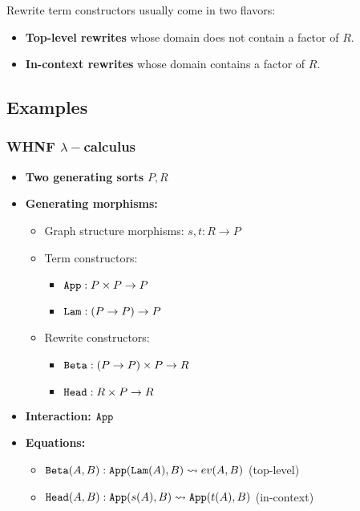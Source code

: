 \documentclass{article}
\begin{document}
Rewrite term constructors usually come in two flavors:

\begin{itemize}
    \item \textbf{Top-level rewrites} whose domain does not contain a factor of $R$.
    \item \textbf{In-context rewrites} whose domain contains a factor of $R$.
\end{itemize}

\subsection{Examples}
\subsubsection{WHNF $\lambda-$calculus}

\begin{itemize}
    \item \textbf{Two generating sorts} $P, R$
    \item \textbf{Generating morphisms:}
    \begin{itemize}
        \item Graph structure morphisms: $s, t : R \to P$
        \item Term constructors: 
        \begin{itemize}
            \item ${\tt App} : P \times P \to P$
            \item ${\tt Lam} : (P \to P) \to P$
        \end{itemize}
        \item Rewrite constructors:
        \begin{itemize}
            \item ${\tt Beta} : (P \to P) \times P \to R$
            \item ${\tt Head} : R \times P \to R$
        \end{itemize}
    \end{itemize}
    \item \textbf{Interaction:} ${\tt App}$
    \item \textbf{Equations:}
    \begin{itemize}
        \item ${\tt Beta}(A, B) : {\tt App}({\tt Lam}(A), B) \leadsto ev(A, B)$ (top-level)
        \item ${\tt Head}(A, B) : {\tt App}(s(A), B) \leadsto {\tt App}(t(A), B)$ (in-context)
    \end{itemize}
\end{itemize}
\end{document}
